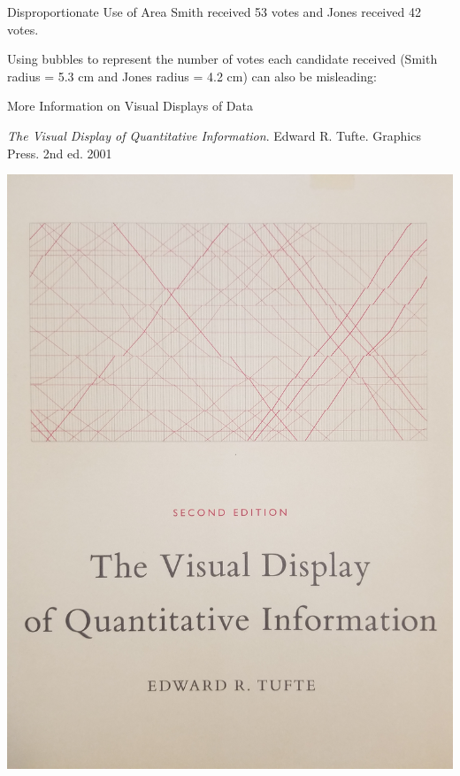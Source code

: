 \documentclass[t]{beamer}
\begin{document}
\begin{frame}{Disproportionate Use of Area}
Smith received 53 votes and Jones received 42 votes.	\newline\\	\pause

Using bubbles to represent the number of votes each candidate received (Smith radius = 5.3 cm and Jones radius = 4.2 cm) can also be misleading:	\pause

\begin{center}
\end{center}
\end{frame}

\begin{frame}{More Information on Visual Displays of Data}
\begin{center}
\textit{The Visual Display of Quantitative Information}. Edward R. Tufte. Graphics Press. 2nd ed. 2001	\newline\\
\begin{turn}{-90}
\includegraphics[scale=0.035]{../Images/Tufte.jpg}
\end{turn}
\end{center}
\end{frame}
\end{document}

